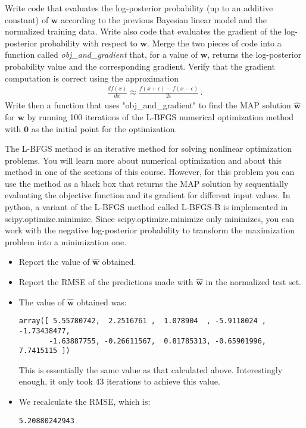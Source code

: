 \documentclass[submit]{harvardml}
\theoremstyle{plain}
\begin{document}
\begin{problem}[14pts]\label{prob:numerical_linear_model}
Write code that evaluates the log-posterior probability (up to an
additive constant) of $\mathbf{w}$ according to the previous Bayesian linear model and the normalized training data.
Write also code that evaluates the gradient of the log-posterior probability with respect to
$\mathbf{w}$. Merge the two pieces of code into a
function called \emph{obj\_and\_gradient} that, for a value of $\mathbf{w}$,
returns the log-posterior probability value and the corresponding gradient.
Verify that the gradient computation is correct using the approximation
\begin{align}
\frac{df(x)}{dx} \approx \frac{f(x + \epsilon) - f(x - \epsilon)}{2\epsilon}\,.
\end{align}
Write then a function that uses "obj\_and\_gradient" to find the MAP solution $\hat{\mathbf{w}}$ for
$\mathbf{w}$ by running 100 iterations of the L-BFGS numerical optimization
method with $\mathbf{0}$ as the initial point for the optimization.

The L-BFGS method is an iterative method for solving nonlinear optimization problems.
You will learn more about numerical optimization and about this method in one of the sections of this course. However,
for this problem you can use the method as a black box that returns the MAP solution
by sequentially evaluating the objective function and its gradient for different input values.
In python, a variant of the L-BFGS method called L-BFGS-B is implemented in scipy.optimize.minimize.
Since scipy.optimize.minimize only minimizes, you can work with the negative
log-posterior probability to transform the maximization problem into a minimization one.

\begin{itemize}
\item Report the value of $\hat{\mathbf{w}}$ obtained.
\item Report the RMSE of the predictions made with $\hat{\mathbf{w}}$ in the normalized test set.
\end{itemize}
\end{problem}

\begin{itemize}
\item The value of $\hat{\mathbf{w}}$ obtained was:
\begin{lstlisting}
array([ 5.55780742,  2.2516761 ,  1.078904  , -5.9118024 , -1.73438477,
       -1.63887755, -0.26611567,  0.81785313, -0.65901996,  7.7415115 ])
\end{lstlisting}
This is essentially the same value as that calculated above. Interestingly enough, it only took $43$ iterations to achieve this value.
\item We recalculate the RMSE, which is:
\begin{lstlisting}
5.20880242943
\end{lstlisting}
\end{itemize}
\end{document}
